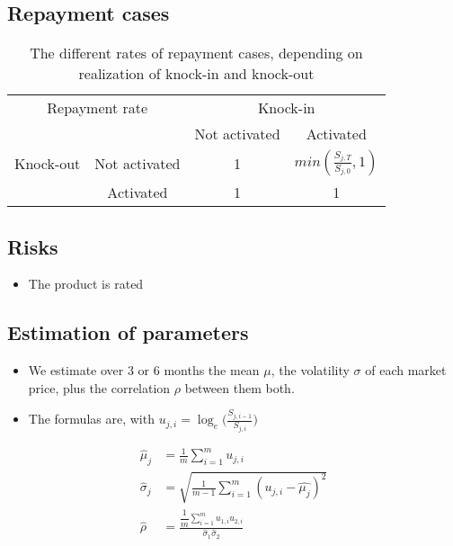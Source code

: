 \subsection{Repayment cases}
\begin{frame}
\myframetitle{}
\begin{table}[c]
	\centering
	\begin{tabular}{|c|c|c|c|} 
    \hline
    \multicolumn{2}{|c|}{Repayment rate} & \multicolumn{2}{c|}{Knock-in} 										 \\
		\cline{3-4}
    \multicolumn{2}{|c|}{}  						 & Not activated 	& Activated 											 \\
    \hline
		Knock-out & Not activated 					 & 1 							& $min(\frac{S_{j,T}}{S_{j,0}},1)$ \\
		\cline{2-4}
							& Activated 							 & 1 							&	1 															 \\
    \hline
	\end{tabular}
	\caption{The different rates of repayment cases, depending on realization of knock-in and knock-out}
\end{table}

\end{frame}

\subsection{Risks}
\begin{frame}
\myframetitle{}
\begin{itemize}
	\item The product is rated 
\end{itemize}

\centering
\end{frame}

\subsection{Estimation of parameters}
\begin{frame}
\myframetitle{}
\begin{itemize}
	\item We estimate over 3 or 6 months the mean $\mu$, the volatility $\sigma$ of each market price, plus the correlation $\rho$ between them both.
	\item The formulas are, with $u_{j,i} = \log_e\bigl(\frac{S_{j,i-1}}{S_{j,i}}\bigr)$
\end{itemize}
\begin{align*}
	\hat{\mu}_j    &= \frac{1}{m} \sum_{i=1}^m u_{j,i} \\
	\hat{\sigma}_j &= \sqrt{\frac{1}{m-1} \sum_{i=1}^m (u_{j,i}-\hat{\mu_j})^2} \\
	\hat{\rho}   \;&= \frac{\dfrac{1}{m}\sum_{i=1}^m u_{1,i}u_{2,i}}{\hat{\sigma}_1 \hat{\sigma}_2}
\end{align*}
\end{frame}

